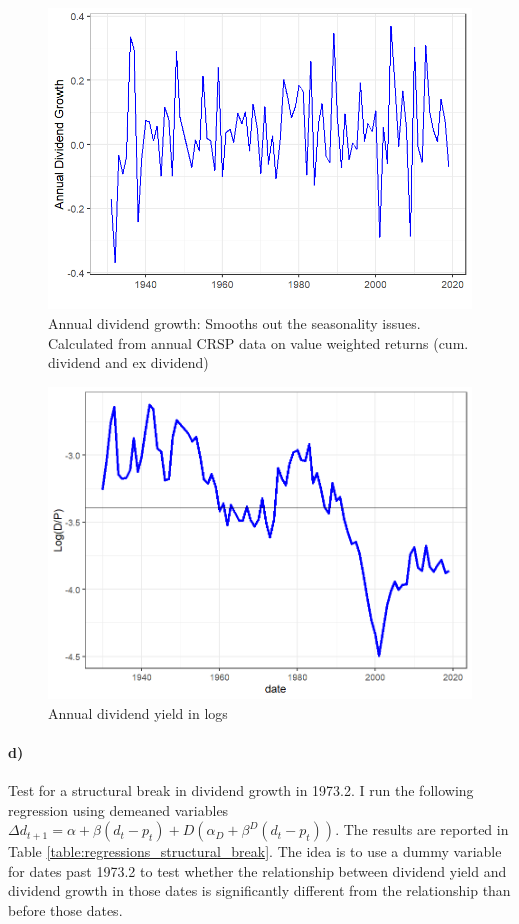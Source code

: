\documentclass[11pt,letter]{article}
\begin{document}
\begin{figure}[!htb]
	\centering
	\includegraphics[scale = 0.4]{annual_dividend_growth.png}
	\caption{Annual dividend growth: Smooths out the seasonality issues. Calculated from annual CRSP data on value weighted returns (cum. dividend and ex dividend) }
	\label{fig:annual_div_growth}
\end{figure}
\begin{figure}[!htb]
	\centering
	\includegraphics[scale = 0.4]{div_yield_plot.png}
	\caption{Annual dividend yield in logs}
	\label{fig:div_yield}
\end{figure}
\newpage 
\paragraph{d)} Test for a structural break in dividend growth in 1973.2. I run the following regression using demeaned variables  $\Delta d_{t+1} = \alpha + \beta (d_t - p_t) + D (\alpha_D + \beta^D (d_t - p_t))$. The results are reported in Table \ref{table:regressions_structural_break}. The idea is to use a dummy variable for dates past 1973.2 to test whether the relationship between dividend yield and dividend growth in those dates is significantly different from the relationship than before those dates. \\
\end{document}
